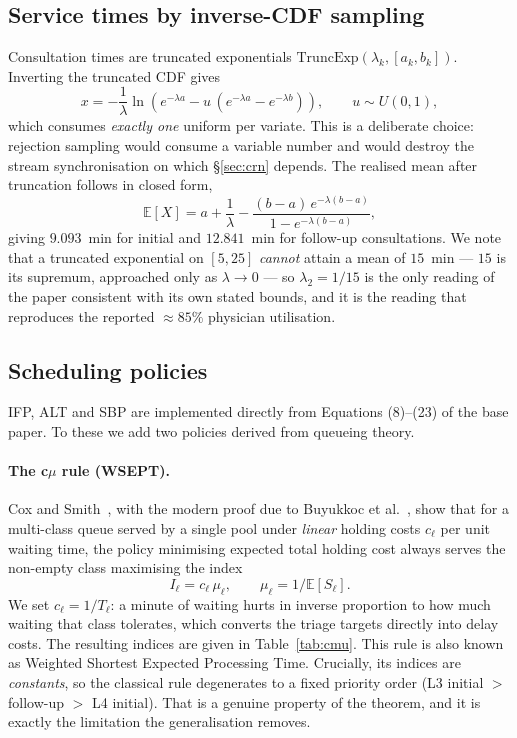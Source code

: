 \documentclass[sigconf,nonacm]{acmart}
\begin{document}
\subsection{Service times by inverse-CDF sampling}
Consultation times are truncated exponentials $\mathrm{TruncExp}(\lambda_k,
[a_k,b_k])$. Inverting the truncated CDF gives
\begin{equation}
x = -\frac{1}{\lambda}
    \ln\!\left( e^{-\lambda a} - u\,(e^{-\lambda a}-e^{-\lambda b}) \right),
\qquad u\sim U(0,1),
\label{eq:truncexp}
\end{equation}
which consumes \emph{exactly one} uniform per variate. This is a deliberate
choice: rejection sampling would consume a variable number and would destroy
the stream synchronisation on which \S\ref{sec:crn} depends. The realised mean
after truncation follows in closed form,
\begin{equation}
\mathbb{E}[X] = a + \frac{1}{\lambda}
  - \frac{(b-a)\,e^{-\lambda(b-a)}}{1-e^{-\lambda(b-a)}} ,
\label{eq:truncmean}
\end{equation}
giving $9.093$~min for initial and $12.841$~min for follow-up consultations.
We note that a truncated exponential on $[5,25]$ \emph{cannot} attain a mean of
$15$~min --- $15$ is its supremum, approached only as $\lambda\to0$ --- so
$\lambda_2=1/15$ is the only reading of the paper consistent with its own
stated bounds, and it is the reading that reproduces the reported
$\approx85\%$ physician utilisation.

\subsection{Scheduling policies}
\label{sec:cmu}
IFP, ALT and SBP are implemented directly from Equations (8)--(23) of the base
paper. To these we add two policies derived from queueing theory.

\paragraph{The c$\mu$ rule (WSEPT).}
Cox and Smith~\cite{cox1961queues}, with the modern proof due to Buyukkoc et
al.~\cite{buyukkoc1985cmu}, show that for a multi-class queue served by a single
pool under \emph{linear} holding costs $c_\ell$ per unit waiting time, the
policy minimising expected total holding cost always serves the non-empty class
maximising the index
\begin{equation}
I_\ell = c_\ell\,\mu_\ell ,
\qquad \mu_\ell = 1/\mathbb{E}[S_\ell] .
\label{eq:cmu}
\end{equation}
We set $c_\ell = 1/T_\ell$: a minute of waiting hurts in inverse proportion to
how much waiting that class tolerates, which converts the triage targets
directly into delay costs. The resulting indices are given in
Table~\ref{tab:cmu}. This rule is also known as Weighted Shortest Expected
Processing Time. Crucially, its indices are \emph{constants}, so the classical
rule degenerates to a fixed priority order (L3 initial $>$ follow-up $>$ L4
initial). That is a genuine property of the theorem, and it is exactly the
limitation the generalisation removes.
\end{document}
